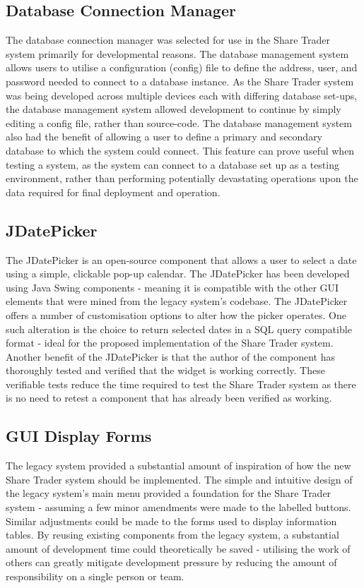 \documentclass[12pt, a4paper,titlepage]{article}
\begin{document}
\subsection{Database Connection Manager}
The database connection manager was selected for use in the Share Trader
system primarily for developmental reasons.
The database management system allows users to utilise a configuration
(config) file to define the address, user, and password needed to connect to a
database instance. 
As the Share Trader system was being developed across multiple
devices each with differing database set-ups, the database management system
allowed development to continue by simply editing a config file, rather than
source-code.  
The database management system also had the benefit of
allowing a user to define a primary and secondary database to which the system
could connect. 
This feature can prove useful when testing a system, as the system can connect
to a database set up as a testing environment, rather than performing
potentially devastating operations upon the data required for final deployment
and operation.

\subsection{JDatePicker}
The JDatePicker is an open-source component that allows a user to select a
date using a simple, clickable pop-up calendar.
The JDatePicker has been developed using Java Swing components - meaning it is
compatible with the other GUI elements that were mined from the legacy system's
codebase.
The JDatePicker offers a number of customisation options to alter how the
picker operates.
One such alteration is the choice to return selected dates in a SQL query
compatible format - ideal for the proposed implementation of the Share Trader
system.  
Another benefit of the JDatePicker is that the author of the component has
thoroughly tested and verified that the widget is working correctly. 
These verifiable tests reduce the time required to test the Share Trader system
as there is no need to retest a component that has already been verified as
working.

\subsection{GUI Display Forms}
The legacy system provided a substantial amount of inspiration of how the new
Share Trader system should be implemented. 
The simple and intuitive design of the legacy system’s main menu provided a
foundation for the Share Trader system - assuming a few minor amendments were
made to the labelled buttons.
Similar adjustments could be made to the forms used to display information
tables.  
By reusing existing components from the legacy system, a substantial
amount of development time could theoretically be saved - utilising the work
of others can greatly mitigate development pressure by reducing the amount of
responsibility on a single person or team.
\end{document}
